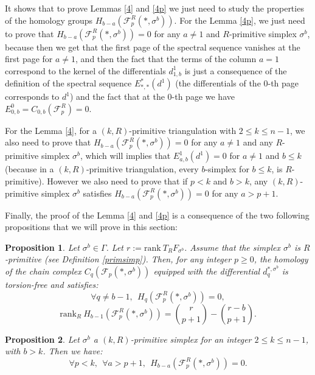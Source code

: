 \documentclass{article}
\newtheorem{proposition}{Proposition}
\begin{document}
It shows that to prove Lemmas \ref{4} and \ref{4p} we just need to study the properties of the homology groups $H_{b-a}(\mathcal{F}_p^R(*,\sigma^b))$. For the Lemma \ref{4p}, we just need to prove that $H_{b-a}(\mathcal{F}_p^R(*,\sigma^b))=0$ for any $a\neq 1$ and $R$-primitive simplex $\sigma^b$, because then we get that the first page of the spectral sequence vanishes at the first page for $a\neq 1$, and then the fact that the terms of the column $a=1$ correspond to the kernel of the differentials $d^1_{1,b}$ is just a consequence of the definition of the spectral sequence $E^*_{*,*}(d^1)$ (the differentials of the $0$-th page corresponds to $d^1$) and the fact that at the $0$-th page we have $E^0_{0,b} = C_{0,b}(\mathcal{F}_p^R)=0$.

For the Lemma \ref{4}, for a $(k,R)$-primitive triangulation with $2 \leq k \leq n-1$, we also need to prove that $H_{b-a}(\mathcal{F}_p^R(*,\sigma^b))=0$ for any $a\neq 1$ and any $R$-primitive simplex $\sigma^b$, which will implies that $E^1_{a,b}(d^{1})=0$ for $a \neq 1$ and $b\leq k$ (because in a $(k,R)$-primitive triangulation, every $b$-simplex for $b\leq k$, is $R$-primitive). However we also need to prove that if $p<k$ and $b>k$, any $(k,R)$-primitive simplex $\sigma^b$ satisfies $H_{b-a}(\mathcal{F}_p^R(*,\sigma^b))=0$ for any $a>p+1$.

Finally, the proof of the Lemma \ref{4} and \ref{4p} is a consequence of the two following propositions that we will prove in this section:

\begin{proposition}
    Let $\sigma^b \in \Gamma$. Let $r:=\mathrm{rank} ~ T_R F_{\sigma^b}$. Assume that the simplex $\sigma^b$ is $R$-primitive (see Definition \ref{primsimp}). Then, for any integer $p \geq 0$, the homology of the chain complex $C_{q}(\mathcal{F}_p(*,\sigma^b))$ equipped with the differential $d^{*,\sigma^b}_{q}$ is torsion-free and satisfies:
    \begin{equation*}
        \forall q \neq b-1, ~~H_q(\mathcal{F}^R_p(*,\sigma^b)) = 0,
    \end{equation*}
    \begin{equation*}
        \mathrm{rank}_R ~ H_{b-1}(\mathcal{F}^R_p(*,\sigma^b)) = \binom{r}{p+1} - \binom{r-b}{p+1}.
    \end{equation*}
    \label{theohom}
\end{proposition}

\begin{proposition}
    Let $\sigma^b$ a $(k,R)$-primitive simplex for an integer $2\leq k \leq n-1$, with $b>k$. Then we have:
    \begin{equation*}
        \forall p<k,~~\forall a>p+1, ~~H_{b-a}(\mathcal{F}_p^R(*,\sigma^b)) = 0.
    \end{equation*}
    \label{prop25}
\end{proposition}
\end{document}
